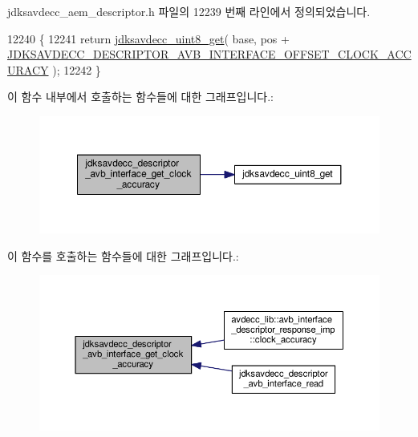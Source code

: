 jdksavdecc\+\_\+aem\+\_\+descriptor.\+h 파일의 12239 번째 라인에서 정의되었습니다.


\begin{DoxyCode}
12240 \{
12241     \textcolor{keywordflow}{return} \hyperlink{group__endian_ga27091e0bf32429d162f641a3f4bc933f}{jdksavdecc\_uint8\_get}( base, pos + 
      \hyperlink{group__descriptor__avb__interface_gab8c2aae0f698912c9e4680f653abc534}{JDKSAVDECC\_DESCRIPTOR\_AVB\_INTERFACE\_OFFSET\_CLOCK\_ACCURACY}
       );
12242 \}
\end{DoxyCode}


이 함수 내부에서 호출하는 함수들에 대한 그래프입니다.\+:
\nopagebreak
\begin{figure}[H]
\begin{center}
\leavevmode
\includegraphics[width=350pt]{group__descriptor__avb__interface_ga039cb9a8f62227783caacf966490eda9_cgraph}
\end{center}
\end{figure}




이 함수를 호출하는 함수들에 대한 그래프입니다.\+:
\nopagebreak
\begin{figure}[H]
\begin{center}
\leavevmode
\includegraphics[width=350pt]{group__descriptor__avb__interface_ga039cb9a8f62227783caacf966490eda9_icgraph}
\end{center}
\end{figure}


